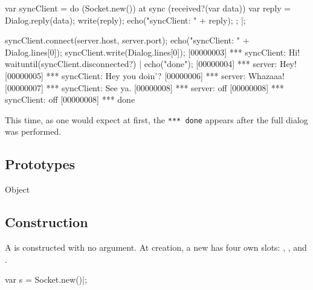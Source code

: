 \begin{urbiscript}
var syncClient =
  do (Socket.new())
  {
    at sync (received?(var data))
    {
      var reply = Dialog.reply(data);
      write(reply);
      echo("syncClient: " + reply);
    };
  }|;

syncClient.connect(server.host, server.port);
echo("syncClient: " + Dialog.lines[0]);
syncClient.write(Dialog.lines[0]);
[00000003] *** syncClient: Hi!
waituntil(syncClient.disconnected?) | echo("done");
[00000004] *** server: Hey!
[00000005] *** syncClient: Hey you doin'?
[00000006] *** server: Whazaaa!
[00000007] *** syncClient: See ya.
[00000008] *** server: off
[00000008] *** syncClient: off
[00000008] *** done
\end{urbiscript}

\noindent
This time, as one would expect at first, the \lstinline{*** done} appears
after the full dialog was performed.


\subsection{Prototypes}
\begin{refObjects}
\item[Object]
\end{refObjects}

\subsection{Construction}

A  is constructed with no argument. At creation, a
new  has four own slots: ,
,  and .

\begin{urbiscript}
var s = Socket.new()|;
\end{urbiscript}

